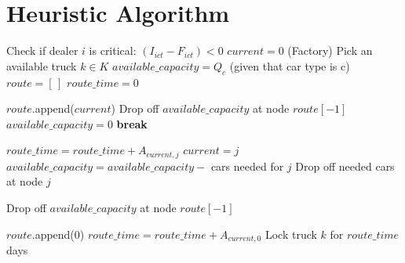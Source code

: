 \documentclass{article}
\begin{document}
\section*{Heuristic Algorithm}

\begin{algorithm}[H]
\caption{Greedy Insertion Heuristic}
\begin{algorithmic}[1]
            \State Check if dealer $i$ is critical: $(I_{ict} - F_{ict}) < 0$
        \EndFor
            \State $current = 0$ (Factory)
            \State Pick an available truck $k \in K$
            \State $available\_capacity = Q_c$   (given that car type is c)
            \State $route = [\,]$
            \State $route\_time = 0$
            
                \State $route$.append($current$)
                                \State Drop off $available\_capacity$ at node $route[-1]$
                            \EndIf
                            \State $available\_capacity = 0$
                            \State \textbf{break}
                        \EndIf
                        
                        \State $route\_time = route\_time + A_{current, j}$
                        \State $current = j$
                        \State $available\_capacity = available\_capacity - $ cars needed for $j$
                        \State Drop off needed cars at node $j$
                    \EndIf
                \EndFor
            \EndWhile
            
                    \State Drop off $available\_capacity$ at node $route[-1]$
                \EndIf
            \EndIf
            
            \State $route$.append($0$)
            \State $route\_time = route\_time + A_{current, 0}$
            \State Lock truck $k$ for $route\_time$ days
        \EndWhile
    \EndFor
\EndFor
\end{algorithmic}
\end{algorithm}
\end{document}

